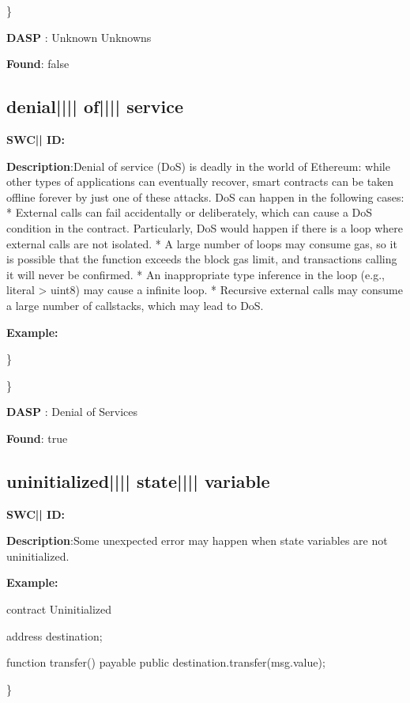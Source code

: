 \documentclass{article}
\begin{document}
\} 

\textbf{DASP} : Unknown Unknowns

\textbf{Found}: false

\subsection{denial{||\textunderscore|| }of{||\textunderscore|| }service} 
\textbf{SWC{|\textunderscore| }ID:} 

\textbf{Description}:Denial of service (DoS) is deadly in the world of Ethereum: while other types of applications can eventually recover, smart contracts can be taken offline forever by just one of these attacks. DoS can happen in the following cases:
* External calls can fail accidentally or deliberately, which can cause a DoS condition in the contract. Particularly, DoS would happen if there is a loop where external calls are not isolated.
* A large number of loops may consume gas, so it is possible that the function exceeds the block gas limit, and transactions calling it will never be confirmed.
* An inappropriate type inference in the loop (e.g., literal {\textendash}> uint8) may cause a infinite loop.
* Recursive external calls may consume a large number of callstacks, which may lead to DoS.


\textbf{Example:} 
\begin{ffcode} 

for (var i = 0; i < array.length; i++) { /* ... */

\end{ffcode} 
\} 

\} 

\textbf{DASP} : Denial of Services

\textbf{Found}: true

\subsection{uninitialized{||\textunderscore|| }state{||\textunderscore|| }variable} 
\textbf{SWC{|\textunderscore| }ID:} 

\textbf{Description}:Some unexpected error may happen when state variables are not uninitialized.


\textbf{Example:} 
\begin{ffcode} 

contract Uninitialized{
    address destination;

    function transfer() payable public{
        destination.transfer(msg.value);
    }
}

\end{ffcode} 
\} 
\end{document}
